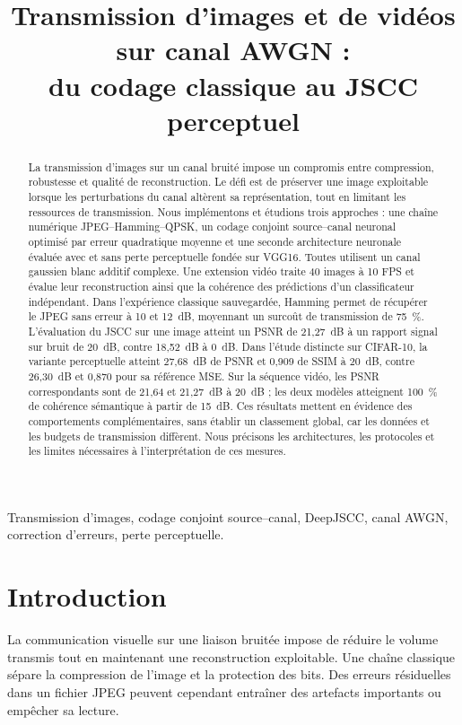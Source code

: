 \documentclass[conference]{IEEEtran}
\begin{document}
\title{Transmission d'images et de vidéos sur canal AWGN :\\
du codage classique au JSCC perceptuel}
\author{}
\maketitle

\begin{abstract}
La transmission d'images sur un canal bruité impose un compromis entre
compression, robustesse et qualité de reconstruction. Le défi est de
préserver une image exploitable lorsque les perturbations du canal
altèrent sa représentation, tout en limitant les ressources de
transmission. Nous implémentons et étudions trois approches : une chaîne
numérique JPEG--Hamming--QPSK, un codage conjoint source--canal neuronal
optimisé par erreur quadratique moyenne et une seconde architecture
neuronale évaluée avec et sans perte perceptuelle fondée sur VGG16.
Toutes utilisent un canal gaussien blanc additif complexe. Une extension
vidéo traite 40 images à 10 FPS et évalue leur reconstruction ainsi
que la cohérence des prédictions d'un classificateur indépendant. Dans
l'expérience classique sauvegardée, Hamming permet de récupérer le JPEG
sans erreur à 10 et 12~dB, moyennant un surcoût de transmission de
75~\%. L'évaluation du JSCC sur une image atteint un PSNR de 21,27~dB
à un rapport signal sur bruit de 20~dB, contre 18,52~dB à 0~dB.
Dans l'étude distincte sur CIFAR-10, la variante perceptuelle atteint
27,68~dB de PSNR et 0,909 de SSIM à 20~dB, contre 26,30~dB et 0,870
pour sa référence MSE. Sur la séquence vidéo, les PSNR correspondants
sont de 21,64 et 21,27~dB à 20~dB ; les deux modèles atteignent
100~\% de cohérence sémantique à partir de 15~dB.
Ces résultats mettent en évidence des
comportements complémentaires, sans établir un classement global,
car les données et les budgets de transmission diffèrent. Nous
précisons les architectures, les protocoles et les limites nécessaires
à l'interprétation de ces mesures.
\end{abstract}

\begin{IEEEkeywords}
Transmission d'images, codage conjoint source--canal, DeepJSCC,
canal AWGN, correction d'erreurs, perte perceptuelle.
\end{IEEEkeywords}

\section{Introduction}
La communication visuelle sur une liaison bruitée impose de réduire
le volume transmis tout en maintenant une reconstruction exploitable.
Une chaîne classique sépare la compression de l'image et la protection
des bits. Des erreurs résiduelles dans un fichier JPEG peuvent
cependant entraîner des artefacts importants ou empêcher sa lecture.
\end{document}
